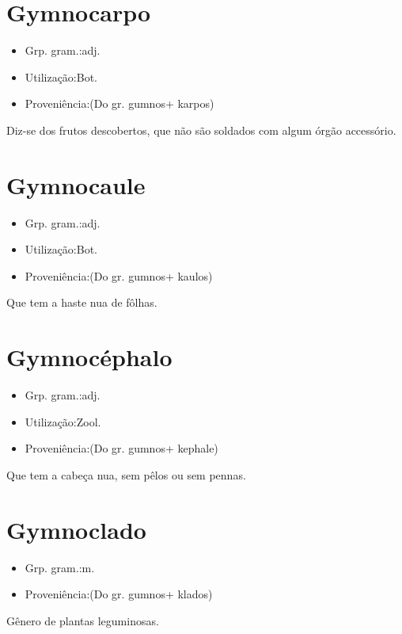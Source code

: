\section{Gymnocarpo}
\begin{itemize}
\item {Grp. gram.:adj.}
\end{itemize}
\begin{itemize}
\item {Utilização:Bot.}
\end{itemize}
\begin{itemize}
\item {Proveniência:(Do gr. \textunderscore gumnos\textunderscore  + \textunderscore karpos\textunderscore )}
\end{itemize}
Diz-se dos frutos descobertos, que não são soldados com algum órgão accessório.
\section{Gymnocaule}
\begin{itemize}
\item {Grp. gram.:adj.}
\end{itemize}
\begin{itemize}
\item {Utilização:Bot.}
\end{itemize}
\begin{itemize}
\item {Proveniência:(Do gr. \textunderscore gumnos\textunderscore  + \textunderscore kaulos\textunderscore )}
\end{itemize}
Que tem a haste nua de fôlhas.
\section{Gymnocéphalo}
\begin{itemize}
\item {Grp. gram.:adj.}
\end{itemize}
\begin{itemize}
\item {Utilização:Zool.}
\end{itemize}
\begin{itemize}
\item {Proveniência:(Do gr. \textunderscore gumnos\textunderscore  + \textunderscore kephale\textunderscore )}
\end{itemize}
Que tem a cabeça nua, sem pêlos ou sem pennas.
\section{Gymnoclado}
\begin{itemize}
\item {Grp. gram.:m.}
\end{itemize}
\begin{itemize}
\item {Proveniência:(Do gr. \textunderscore gumnos\textunderscore  + \textunderscore klados\textunderscore )}
\end{itemize}
Gênero de plantas leguminosas.
